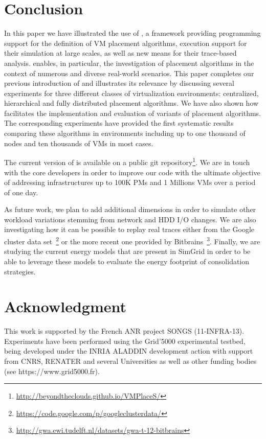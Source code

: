 \section{Conclusion}
\label{sec:conclusion}
In this paper we have illustrated the use of
\vmps, a framework providing programming support for the definition of
VM placement algorithms, execution support for their simulation at
large scales, as well as new means for their trace-based analysis.
\vmps enables, in particular, the investigation of placement
algorithms in the context of numerous and diverse real-world
scenarios. This paper completes our previous introduction of \vmps
\cite{vmplaces:europar15} and illustrates its relevance by discussing
several experiments for three different classes of virtualization
environments: centralized, hierarchical and fully distributed
placement algorithms.  We have also shown how \vmps facilitates the
implementation and evaluation of variants of placement algorithms. The
corresponding experiments have provided the first systematic results
comparing these algorithms in environments including up to one
thousand of nodes and ten thousands of VMs in most cases.

The current version of \vmps is available on a public git
repository\footnote{\url{http://beyondtheclouds.github.io/VMPlaceS/}}.
We are in touch with the \sg core developers in order to improve our
code with the ultimate objective of addressing infrastructures up to
100K PMs and 1 Millions VMs over a period of one day.

 As future work,
 we plan to add additional dimensions in order to simulate
other workload variations stemming from network and HDD I/O changes.
We are also investigating how it can be possible to replay real traces
either from the Google cluster data
set~\footnote{\href{https://code.google.com/p/googleclusterdata/}{https://code.google.com/p/googleclusterdata/}}
or the more recent one provided by
Bitbrains~\footnote{\href{http://gwa.ewi.tudelft.nl/datasets/gwa-t-12-bitbrains}{http://gwa.ewi.tudelft.nl/datasets/gwa-t-12-bitbrains}}.
Finally, we are studying the current energy models that are present in
SimGrid in order to be able to leverage these models to evaluate the
energy footprint of consolidation strategies.

\section{Acknowledgment}

This work is supported by the French ANR project SONGS (11-INFRA-13).
Experiments have been performed using the Grid'5000 experimental
testbed, being developed under the INRIA ALADDIN development action
with support from CNRS, RENATER and several Universities as well as
other funding bodies (see https://www.grid5000.fr).


